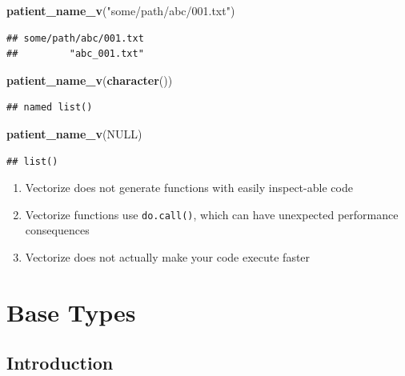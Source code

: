 \documentclass[]{book}
\newenvironment{Shaded}{\begin{snugshade}}{\end{snugshade}}
\newcommand{\KeywordTok}[1]{\textcolor[rgb]{0.13,0.29,0.53}{\textbf{#1}}}
\newcommand{\NormalTok}[1]{#1}
\newcommand{\OtherTok}[1]{\textcolor[rgb]{0.56,0.35,0.01}{#1}}
\newcommand{\StringTok}[1]{\textcolor[rgb]{0.31,0.60,0.02}{#1}}
\providecommand{\tightlist}{%
  \setlength{\itemsep}{0pt}\setlength{\parskip}{0pt}}
\begin{document}
\begin{Shaded}
\begin{Highlighting}[]
\KeywordTok{patient_name_v}\NormalTok{(}\StringTok{"some/path/abc/001.txt"}\NormalTok{)}
\end{Highlighting}
\end{Shaded}

\begin{verbatim}
## some/path/abc/001.txt 
##         "abc_001.txt"
\end{verbatim}

\begin{Shaded}
\begin{Highlighting}[]
\KeywordTok{patient_name_v}\NormalTok{(}\KeywordTok{character}\NormalTok{())}
\end{Highlighting}
\end{Shaded}

\begin{verbatim}
## named list()
\end{verbatim}

\begin{Shaded}
\begin{Highlighting}[]
\KeywordTok{patient_name_v}\NormalTok{(}\OtherTok{NULL}\NormalTok{)}
\end{Highlighting}
\end{Shaded}

\begin{verbatim}
## list()
\end{verbatim}

\begin{enumerate}
\def\labelenumi{\arabic{enumi}.}
\setcounter{enumi}{1}
\tightlist
\item
  Vectorize does not generate functions with easily inspect-able code
\item
  Vectorize functions use \texttt{do.call()}, which can have unexpected performance consequences
\item
  Vectorize does not actually make your code execute faster
\end{enumerate}

\hypertarget{base-types}{%
\chapter{Base Types}\label{base-types}}

\hypertarget{introduction-2}{%
\section*{Introduction}\label{introduction-2}}
\end{document}
